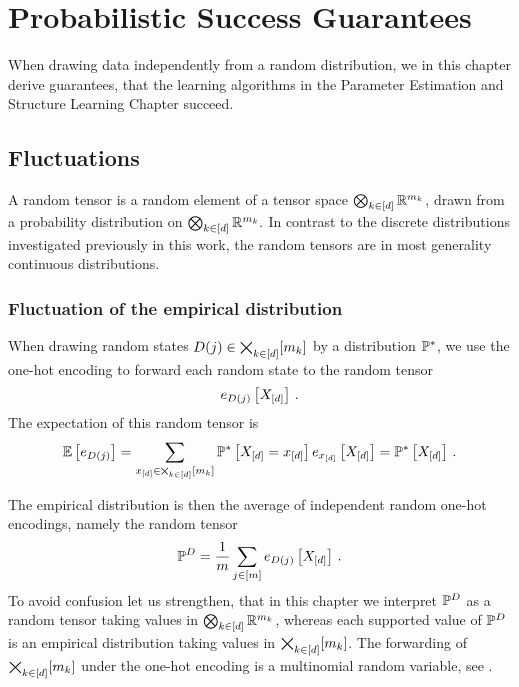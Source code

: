 \section{Probabilistic Success Guarantees}\label{cha:mlnConcentration}

When drawing data independently from a random distribution, we in this chapter derive guarantees, that the learning algorithms in the Parameter Estimation and Structure Learning Chapter succeed.

%
	
	
\subsection{Fluctuations}

A random tensor is a random element of a tensor space $\bigotimes_{k\in[d]} \mathbb{R}^{m_{k}}$, drawn from a probability distribution on $\bigotimes_{k\in[d]} \mathbb{R}^{m_{k}}.$
In contrast to the discrete distributions investigated previously in this work, the random tensors are in most generality continuous distributions. %

\subsubsection{Fluctuation of the empirical distribution}

When drawing random states $D(j)\in\bigtimes_{k\in[d]}[m_{k}]$ by a distribution $\mathbb{P}^*$, we use the one-hot encoding to forward each random state to the random tensor
	\[ e_{D(j)}\left[X_{[d]}\right] \, . \]
The expectation of this random tensor is
\begin{align*}
	\mathbb{E}\left[e_{D(j)}\right] 
	= \sum_{x_{[d]}\in\bigtimes_{k\in[d]}[m_{k}]} \mathbb{P}^*\left[X_{[d]}=x_{[d]}\right] e_{x_{[d]}}\left[X_{[d]}\right] 
	= \mathbb{P}^*\left[X_{[d]}\right] \, . 
\end{align*}
	
The empirical distribution is then the average of independent random one-hot encodings, namely the random tensor
	\[ \mathbb{P}^{D} = \frac{1}{m} \sum_{j\in[m]}  e_{D(j)}\left[X_{[d]}\right] \, . \]
To avoid confusion let us strengthen, that in this chapter we interpret $\mathbb{P}^{D}$ as a random tensor taking values in $\bigotimes_{k\in[d]} \mathbb{R}^{m_{k}}$, whereas each supported value of $\mathbb{P}^{D}$ is an empirical distribution taking values in $\bigtimes_{k\in[d]}[m_{k}]$.
The forwarding of $\bigtimes_{k\in[d]}[m_{k}]$ under the one-hot encoding is a multinomial random variable, see .


